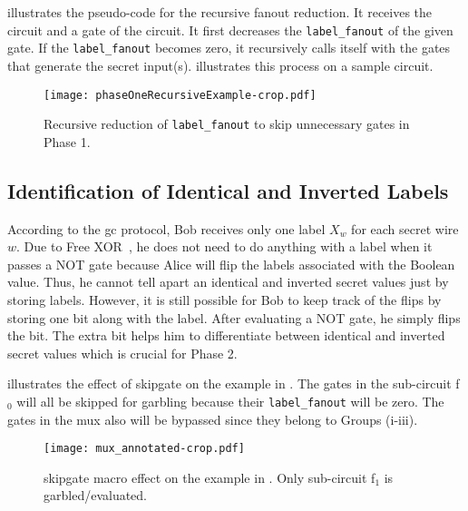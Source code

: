  illustrates the pseudo-code for the recursive fanout reduction.
It receives the circuit and a gate of the circuit.
It first decreases the \texttt{label\_fanout} of the given gate.
If the \texttt{label\_fanout} becomes zero, it recursively calls itself with the gates that generate the secret input(s).
 illustrates this process on a sample circuit.

\begin{figure}
    \centering
    \texttt{[image: phaseOneRecursiveExample-crop.pdf]}
    \caption{Recursive reduction of \texttt{label\_fanout} to skip unnecessary gates in Phase 1.}
    \label{fig:phaseOneRecursive}
\end{figure}

\subsection{Identification of Identical and Inverted Labels}\label{ssec:skipgate-ident}
According to the \acrshort{gc} protocol, Bob receives only one label $X_w$ for each secret wire $w$.
Due to Free XOR~\cite{kolesnikov2008improved}, he does not need to do anything with a label when it passes a NOT gate because Alice will flip the labels associated with the Boolean value.
Thus, he cannot tell apart an identical and inverted secret values just by storing labels.
However, it is still possible for Bob to keep track of the flips by storing one bit along with the label.
After evaluating a NOT gate, he simply flips the bit.
The extra bit helps him to differentiate between identical and inverted secret values which is crucial for Phase 2.

 illustrates the effect of \gls{skipgate} on the example in .
The gates in the sub-circuit f$_0$ will all be skipped for garbling because their \texttt{label\_fanout} will be zero.
The gates in the \acrshort{mux} also will be bypassed since they belong to Groups (i-iii).

\begin{figure}
    \centering
    \texttt{[image: mux\_annotated-crop.pdf]}
    \caption{\gls{skipgate} macro effect on the example in .
    		 Only sub-circuit f$_1$ is garbled/evaluated.}
\label{fig:mux_annotated}
\end{figure}


